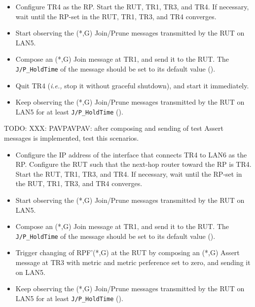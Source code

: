 \documentclass[11pt]{report}
\newcommand{\ie}{\emph{i.e.,}\xspace}
\begin{document}

\begin{itemize}

  \item Configure TR4 as the RP. Start the RUT, TR1, TR3, and TR4. If
  necessary, wait until the RP-set in the RUT, TR1, TR3, and TR4
  converges.

  \item Start observing the (*,G) Join/Prune messages transmitted by the
  RUT on LAN5.

  \item Compose an (*,G) Join message at TR1, and send it to the RUT. 
  The \verb=J/P_HoldTime= of the message should be set to its default
  value ({\PimsmJPHoldTime}).

  \item Quit TR4 (\ie stop it without graceful shutdown), and start it
  immediately.

  \item Keep observing the (*,G) Join/Prune messages transmitted by the
  RUT on LAN5 for at least \verb=J/P_HoldTime= ({\PimsmJPHoldTime}).

\end{itemize}


TODO: XXX: PAVPAVPAV: after composing and sending of test Assert messages is
implemented, test this scenarios.

\begin{itemize}

  \item Configure the IP address of the interface that connects TR4 to LAN6 as
  the RP. Configure the RUT such that the next-hop router toward the RP is
  TR4. Start the RUT, TR1, TR3, and TR4. If necessary, wait until the
  RP-set in the RUT, TR1, TR3, and TR4 converges.

  \item Start observing the (*,G) Join/Prune messages transmitted by the
  RUT on LAN5.

  \item Compose an (*,G) Join message at TR1, and send it to the RUT. 
  The \verb=J/P_HoldTime= of the message should be set to its default
  value ({\PimsmJPHoldTime}).

  \item Trigger changing of RPF'(*,G) at the RUT by composing an
  (*,G) Assert message at TR3 with metric and metric 
  perference set to zero, and sending it on LAN5.

  \item Keep observing the (*,G) Join/Prune messages transmitted by the
  RUT on LAN5 for at least \verb=J/P_HoldTime= ({\PimsmJPHoldTime}).

\end{itemize}
\end{document}
